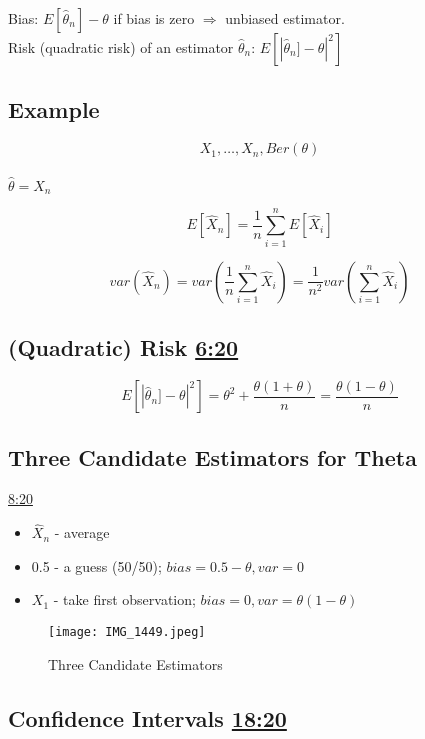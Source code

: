 

Bias: $E[\hat{\theta}_n] - \theta$ if bias is zero $\Rightarrow$ unbiased estimator.
\\
Risk (quadratic risk) of an estimator $\hat{\theta}_n$: $E[|\hat{\theta}_n] - \theta|^2]$

\subsection*{Example}

$$X_1,\ldots, X_n, Ber(\theta)$$
\\
$\hat{\theta} = X_n$

$$
E[\hat{X}_n] = \frac{1}{n} \sum_{i=1}^n E[\hat{X}_i]
$$

$$
var(\hat{X}_n) = var(\frac{1}{n} \sum_{i=1}^n \hat{X}_i) = \frac{1}{n^2} var( \sum_{i=1}^n \hat{X}_i)
$$

\subsection*{(Quadratic) Risk \href{https://youtu.be/rLlZpnT02ZU?t=6m20s}{6:20}}

$$
E[|\hat{\theta}_n] - \theta|^2] = \theta^2 + \frac{\theta(1+\theta)}{n} = \frac{\theta(1-\theta)}{n}
$$
\subsection{Three Candidate Estimators for Theta}

\href{https://youtu.be/rLlZpnT02ZU?t=8m20s}{8:20}

\begin{itemize}
    \item $\hat{X}_n$ - average
    \item 0.5 - a guess (50/50); $bias = 0.5 - \theta, var=0$
    \item $X_1$ - take first observation; $bias=0, var=\theta(1-\theta)$
\end{itemize}

\begin{figure}[h]
\centering
\texttt{[image: IMG\_1449.jpeg]}
\caption{Three Candidate Estimators}
\end{figure}

\subsection{Confidence Intervals \href{https://youtu.be/rLlZpnT02ZU?t=18m20s}{18:20}}

